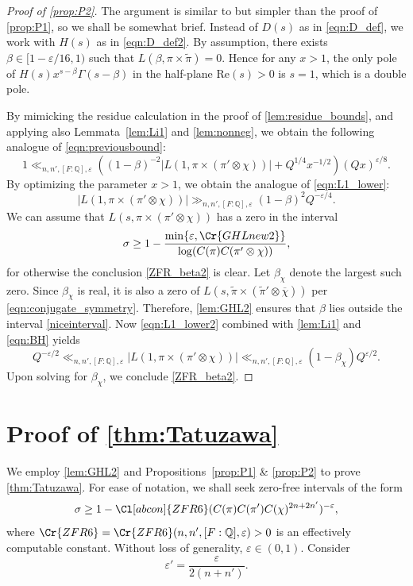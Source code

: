 \documentclass[12pt]{amsart}
\theoremstyle{definition}
\theoremstyle{remark}
\numberwithin{equation}{section}
\theoremstyle{plain}
\renewcommand{\tilde}{\widetilde}
\renewcommand{\bar}{\overline}
\renewcommand{\epsilon}{\varepsilon}
\renewcommand{\Re}{\mathrm{Re}}
\newcommand{\Q}{\mathbb{Q}}
\begin{document}
\begin{proof}[Proof of \cref{prop:P2}] The argument is similar to but simpler than the proof of \cref{prop:P1}, so we shall be somewhat brief. Instead of $D(s)$ as in \eqref{eqn:D_def}, we work with $H(s)$ as in \eqref{eqn:D_def2}. By assumption, there exists $\beta\in[1-\epsilon/16,1)$ such that $L(\beta,\pi\times\tilde\pi)=0$. Hence for any $x>1$, the only pole of $H(s)x^{s-\beta}\Gamma(s-\beta)$ in the half-plane $\Re(s)>0$ is $s=1$, which is a double pole.

By mimicking the residue calculation in the proof of \cref{lem:residue_bounds}, and applying also Lemmata~\ref{lem:Li1} and \ref{lem:nonneg}, we obtain the following analogue of \eqref{eqn:previousbound}:
\[
1\ll_{n,n',[F:\Q],\epsilon} \left((1-\beta)^{-2}|L(1,\pi\times(\pi'\otimes\chi))|+Q^{1/4}x^{-1/2}\right)(Qx)^{\epsilon/8}.	
\]
By optimizing the parameter $x>1$, we obtain the analogue of \eqref{eqn:L1_lower}:
\begin{equation}
\label{eqn:L1_lower2}
|L(1,\pi\times(\pi'\otimes\chi))|\gg_{n,n',[F:\Q],\epsilon}(1-\beta)^{2}Q^{-\epsilon/4}.
\end{equation}
We can assume that $L(s,\pi\times(\pi'\otimes\chi))$ has a zero in the interval
\begin{equation}
\label{niceinterval}
\sigma\geq 1-\frac{\min\{\epsilon,\Cr{GHLnew2}\}}{\log(C(\pi)C(\pi'\otimes\chi))},
\end{equation}
for otherwise the conclusion \eqref{ZFR_beta2} is clear. Let $\beta_\chi$ denote the largest such zero.  Since $\beta_\chi$ is real, it is also a zero of $L(s,\tilde\pi\times(\tilde\pi'\otimes\bar{\chi}))$ per \eqref{eqn:conjugate_symmetry}. Therefore, \cref{lem:GHL2} ensures that $\beta$ lies outside the interval \eqref{niceinterval}. Now \eqref{eqn:L1_lower2} combined with \cref{lem:Li1} and \eqref{eqn:BH} yields
\[
Q^{-\epsilon/2}\ll_{n,n',[F:\Q],\epsilon}|L(1,\pi\times(\pi'\otimes\chi))|\ll_{n,n',[F:\Q],\epsilon}(1-\beta_\chi) Q^{\epsilon/2}.
\]
Upon solving for $\beta_\chi$, we conclude \eqref{ZFR_beta2}.
\end{proof}

\section{Proof of \cref{thm:Tatuzawa}}

We employ \cref{lem:GHL2} and Propositions~\ref{prop:P1} \& \ref{prop:P2} to prove \cref{thm:Tatuzawa}. For ease of notation, we shall seek zero-free intervals of the form
\begin{equation}
\label{niceinterval2}
\sigma\geq 1-\Cl[abcon]{ZFR6}(C(\pi)C(\pi')C(\chi)^{2n+2n'})^{-\epsilon},
\end{equation}
where 
$\Cr{ZFR6}=\Cr{ZFR6}(n,n',[F:\Q],\epsilon)>0$ is an effectively computable constant. Without loss of generality, $\epsilon\in(0,1)$. Consider
\[
\epsilon'=\frac{\epsilon}{2(n+n')}.
\]
\end{document}
